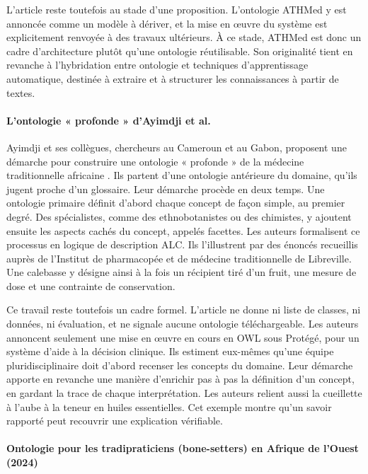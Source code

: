 L'article reste toutefois au stade d'une proposition. L'ontologie ATHMed y est annoncée comme un modèle à dériver, et la mise en œuvre du système est explicitement renvoyée à des travaux ultérieurs. À ce stade, ATHMed est donc un cadre d'architecture plutôt qu'une ontologie réutilisable. Son originalité tient en revanche à l'hybridation entre ontologie et techniques d'apprentissage automatique, destinée à extraire et à structurer les connaissances à partir de textes.

\paragraph{L'ontologie « profonde » d'Ayimdji et al.}

Ayimdji et ses collègues, chercheurs au Cameroun et au Gabon, proposent une démarche pour construire une ontologie « profonde » de la médecine traditionnelle africaine \cite{ayimdji_towards_2011}. Ils partent d'une ontologie antérieure du domaine, qu'ils jugent proche d'un glossaire. Leur démarche procède en deux temps. Une ontologie primaire définit d'abord chaque concept de façon simple, au premier degré. Des spécialistes, comme des ethnobotanistes ou des chimistes, y ajoutent ensuite les aspects cachés du concept, appelés facettes. Les auteurs formalisent ce processus en logique de description ALC. Ils l'illustrent par des énoncés recueillis auprès de l'Institut de pharmacopée et de médecine traditionnelle de Libreville. Une calebasse y désigne ainsi à la fois un récipient tiré d'un fruit, une mesure de dose et une contrainte de conservation.

Ce travail reste toutefois un cadre formel. L'article ne donne ni liste de classes, ni données, ni évaluation, et ne signale aucune ontologie téléchargeable. Les auteurs annoncent seulement une mise en œuvre en cours en OWL sous Protégé, pour un système d'aide à la décision clinique. Ils estiment eux-mêmes qu'une équipe pluridisciplinaire doit d'abord recenser les concepts du domaine. Leur démarche apporte en revanche une manière d'enrichir pas à pas la définition d'un concept, en gardant la trace de chaque interprétation. Les auteurs relient aussi la cueillette à l'aube à la teneur en huiles essentielles. Cet exemple montre qu'un savoir rapporté peut recouvrir une explication vérifiable.

\paragraph{Ontologie pour les tradipraticiens (bone-setters) en Afrique de l'Ouest (2024)}

